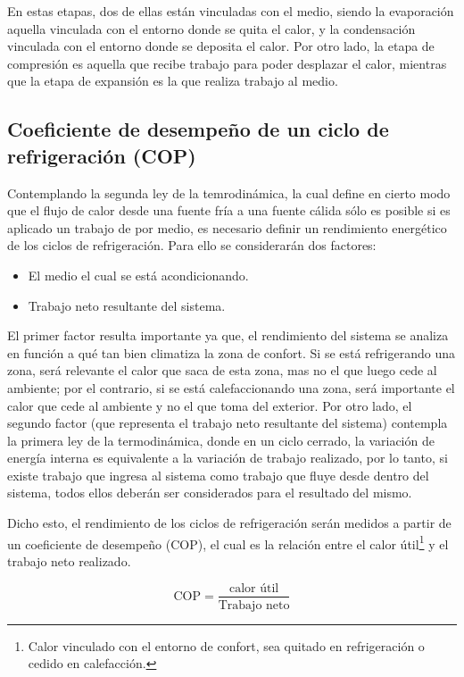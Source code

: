 	En estas etapas, dos de ellas están vinculadas con el medio, siendo la evaporación aquella vinculada con el entorno donde se quita el calor, y la condensación vinculada con el entorno donde se deposita el calor. Por otro lado, la etapa de compresión es aquella que recibe trabajo para poder desplazar el calor, mientras que la etapa de expansión es la que realiza trabajo al medio.

	\subsection{Coeficiente de desempeño de un ciclo de refrigeración (COP)}

	Contemplando la segunda ley de la temrodinámica, la cual define en cierto modo que el flujo de calor desde una fuente fría a una fuente cálida sólo es posible si es aplicado un trabajo de por medio, es necesario definir un rendimiento energético de los ciclos de refrigeración. Para ello se considerarán dos factores:

	\begin{itemize}
		\item El medio el cual se está acondicionando.
		\item Trabajo neto resultante del sistema.
	\end{itemize}

	El primer factor resulta importante ya que, el rendimiento del sistema se analiza en función a qué tan bien climatiza la zona de confort. Si se está refrigerando una zona, será relevante el calor que saca de esta zona, mas no el que luego cede al ambiente; por el contrario, si se está calefaccionando una zona, será importante el calor que cede al ambiente y no el que toma del exterior. Por otro lado, el segundo factor (que representa el trabajo neto resultante del sistema) contempla la primera ley de la termodinámica, donde en un ciclo cerrado, la variación de energía interna es equivalente a la variación de trabajo realizado, por lo tanto, si existe trabajo que ingresa al sistema como trabajo que fluye desde dentro del sistema, todos ellos deberán ser considerados para el resultado del mismo.

	Dicho esto, el rendimiento de los ciclos de refrigeración serán medidos a partir de un coeficiente de desempeño (COP), el cual es la relación entre el calor útil\footnote{Calor vinculado con el entorno de confort, sea quitado en refrigeración o cedido en calefacción.} y el trabajo neto realizado.

	\begin{equation}\label{E1-COP}
		\text{COP} = \dfrac{\text{calor útil}}{\text{Trabajo neto}}
	\end{equation}

